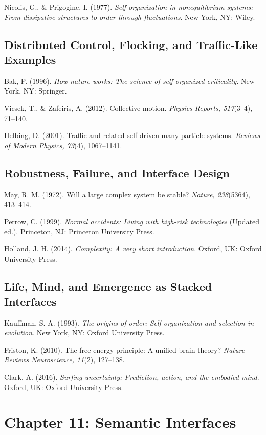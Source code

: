 \documentclass[
  openright]{book}
\begin{document}
Nicolis, G., \& Prigogine, I. (1977). \emph{Self-organization in
nonequilibrium systems: From dissipative structures to order through
fluctuations}. New York, NY: Wiley.

\subsection{Distributed Control, Flocking, and Traffic-Like
Examples}\label{distributed-control-flocking-and-traffic-like-examples-1}

Bak, P. (1996). \emph{How nature works: The science of self-organized
criticality}. New York, NY: Springer.

Vicsek, T., \& Zafeiris, A. (2012). Collective motion. \emph{Physics
Reports, 517}(3--4), 71--140.

Helbing, D. (2001). Traffic and related self-driven many-particle
systems. \emph{Reviews of Modern Physics, 73}(4), 1067--1141.

\subsection{Robustness, Failure, and Interface
Design}\label{robustness-failure-and-interface-design-1}

May, R. M. (1972). Will a large complex system be stable? \emph{Nature,
238}(5364), 413--414.

Perrow, C. (1999). \emph{Normal accidents: Living with high-risk
technologies} (Updated ed.). Princeton, NJ: Princeton University Press.

Holland, J. H. (2014). \emph{Complexity: A very short introduction}.
Oxford, UK: Oxford University Press.

\subsection{Life, Mind, and Emergence as Stacked
Interfaces}\label{life-mind-and-emergence-as-stacked-interfaces-1}

Kauffman, S. A. (1993). \emph{The origins of order: Self-organization
and selection in evolution}. New York, NY: Oxford University Press.

Friston, K. (2010). The free-energy principle: A unified brain theory?
\emph{Nature Reviews Neuroscience, 11}(2), 127--138.

Clark, A. (2016). \emph{Surfing uncertainty: Prediction, action, and the
embodied mind}. Oxford, UK: Oxford University Press.

\section{Chapter 11: Semantic
Interfaces}\label{chapter-11-semantic-interfaces-1}
\end{document}
